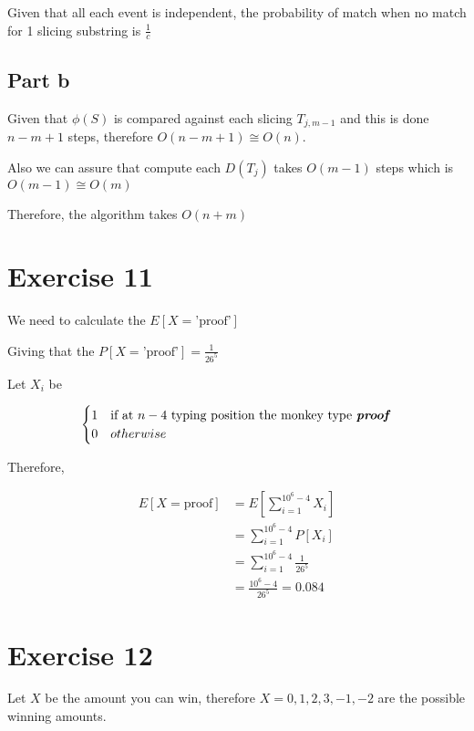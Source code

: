 \documentclass[12pt, a4paper]{article}
\begin{document}
Given that all each event is independent, the probability of match when no match
for 1 slicing substring is $\frac{1}{c}$

\subsection{Part b}

Given that $\phi{(S)}$ is compared against each slicing $T_{j,m-1}$ and this is
done $n-m+1$ steps, therefore $O(n-m+1) \cong O(n)$.

Also we can assure that compute each $D(T_j)$ takes $O(m-1)$ steps which is
$O(m-1) \cong O(m)$

Therefore, the algorithm takes $O(n + m)$

\section{Exercise 11}

We need to calculate the $E[X=\text{'proof'}]$

Giving that the $P[X=\text{'proof'}] = \frac{1}{26^5}$

Let $X_i$ be

\[ \begin{cases} 
    1 & \text{if at } n-4 \text{ typing position the monkey type
      \textit{\textbf{proof}}} \\
    0 & otherwise \\
  \end{cases}
\]

Therefore,

\begin{subequations}
  \begin{align}
    E[X = \text{proof}] &= E\left[\displaystyle\sum_{i=1}^{10^6-4}X_i\right] \\
                        &= \displaystyle\sum_{i=1}^{10^6-4}P[X_i] \\
                        &= \displaystyle\sum_{i=1}^{10^6-4}\frac{1}{26^5} \\
                        &= \frac{10^6-4}{26^5} = 0.084
  \end{align}
\end{subequations}


\section{Exercise 12}

Let $X$ be the amount you can win, therefore $X = {0,1,2,3,-1,-2}$ are the
possible winning amounts.
\end{document}

